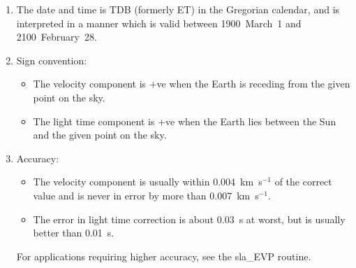 {
 \begin{enumerate}
  \item The date and time is TDB (formerly ET) in the Gregorian
        calendar, and is interpreted in a manner which is valid
        between 1900~March~1 and 2100~February~28.
  \item Sign convention:
        \begin{itemize}
         \item The velocity component is +ve when the
               Earth is receding from
               the given point on the sky.
         \item The light time component is +ve
               when the Earth lies between the Sun and
               the given point on the sky.
        \end{itemize}
 \item Accuracy:
       \begin{itemize}
        \item The velocity component is usually within 0.004~km~s$^{-1}$
              of the correct value and is never in error by more than
              0.007~km~s$^{-1}$.
        \item The error in light time correction is about 0.03~s at worst,
              but is usually better than 0.01~s.
       \end{itemize}
       For applications requiring higher accuracy, see the sla\_EVP routine.
 \end{enumerate}
}
{
}
{
}
{
}
{
}
{
}
{
}

